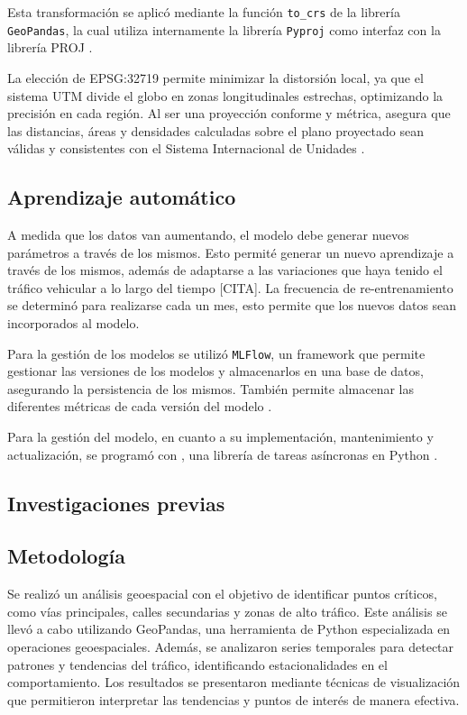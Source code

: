 \documentclass[12pt]{article}
\begin{document}
Esta transformación se aplicó mediante la función \texttt{to\_crs} de la librería \texttt{GeoPandas}, la cual utiliza internamente la librería \texttt{Pyproj} como interfaz con la librería PROJ \citep{gdal_proj, pyproj, geopandas}.

La elección de EPSG:32719 permite minimizar la distorsión local, ya que el sistema UTM divide el globo en zonas longitudinales estrechas, optimizando la precisión en cada región. Al ser una proyección conforme y métrica, asegura que las distancias, áreas y densidades calculadas sobre el plano proyectado sean válidas y consistentes con el Sistema Internacional de Unidades \citep{epsg32719}.

\subsection{Aprendizaje automático}

A medida que los datos van aumentando, el modelo debe generar nuevos parámetros a través de los mismos. Esto permité generar un nuevo aprendizaje a través de los mismos, además de adaptarse a las variaciones que haya tenido el tráfico vehicular a lo largo del tiempo [CITA]. La frecuencia de re-entrenamiento se determinó para realizarse cada un mes, esto permite que los nuevos datos sean incorporados al modelo.

Para la gestión de los modelos se utilizó \texttt{MLFlow}, un framework que permite gestionar las versiones de los modelos y almacenarlos en una base de datos, asegurando la persistencia de los mismos. También permite almacenar las diferentes métricas de cada versión del modelo \citep{mlflow2025}.

Para la gestión del modelo, en cuanto a su implementación, mantenimiento y actualización, se programó con , una librería de tareas asíncronas en Python \citep{apscheduler2025}.

\subsection{Investigaciones previas}

\subsection{Metodología}


Se realizó un análisis geoespacial con el objetivo de identificar puntos críticos, como vías principales, calles secundarias y zonas de alto tráfico. Este análisis se llevó a cabo utilizando GeoPandas, una herramienta de Python especializada en operaciones geoespaciales. Además, se analizaron series temporales para detectar patrones y tendencias del tráfico, identificando estacionalidades en el comportamiento. Los resultados se presentaron mediante técnicas de visualización que permitieron interpretar las tendencias y puntos de interés de manera efectiva.
\end{document}
